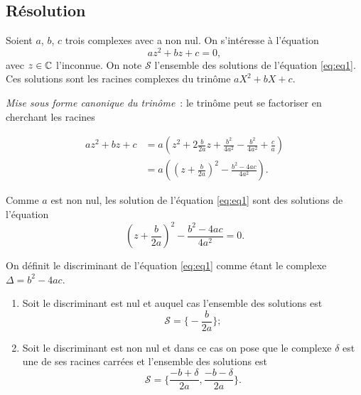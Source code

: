 \subsection{Résolution}
\label{subsec:resolution}

Soient \(a\), \(b\), \(c\) trois complexes avec a non nul. On s'intéresse à 
l'équation
\begin{equation}
  \label{eq:eq1}
  az^2 + bz + c = 0,
\end{equation}
avec \(z \in{}\mathbb{C}\) l'inconnue. On note \(\mathcal{S}\) l'ensemble des solutions 
de l'équation \eqref{eq:eq1}. Ces solutions sont les racines complexes du 
trinôme \(aX^2 + bX + c\).

\emph{Mise sous forme canonique du trinôme}~: le trinôme peut se factoriser en 
cherchant les racines

\begin{align*}
  az^2 + bz + c & = a \left( z^2+ 2 \frac{b}{2a}z + \frac{b^2}{4a^2} - 
  \frac{b^2}{4a^2}  + \frac{c}{a} \right) \\
  & = a \left( \left( z + \frac{b}{2a} \right)^2 - 
  \frac{b^2-4ac}{4a^2} \right).
\end{align*}

Comme \(a\) est non nul, les solution de l'équation \eqref{eq:eq1} sont des 
solutions de l'équation
\begin{equation}
  \left( z + \frac{b}{2a} \right)^2 - \frac{b^2-4ac}{4a^2} = 0.
\end{equation}

\begin{defdef}
  On définit le discriminant de l'équation \eqref{eq:eq1} comme étant le 
  complexe \(\Delta = b^2-4ac\).
\end{defdef}

\begin{enumerate}
  \item Soit le discriminant est nul et auquel cas l'ensemble des solutions 
    est
    \begin{equation}
      \mathcal{S} = \biggl \lbrace-\frac{b}{2a} \biggl \rbrace;
    \end{equation}
  \item Soit le discriminant est non nul et dans ce cas on pose que le 
    complexe \(\delta\) est une de ses racines carrées et l'ensemble des 
    solutions est
    \begin{equation}
      \mathcal{S} = \biggl \lbrace \frac{-b + \delta}{2a} , 
      \frac{-b-\delta}{2a} \biggl \rbrace.
    \end{equation}
\end{enumerate}

